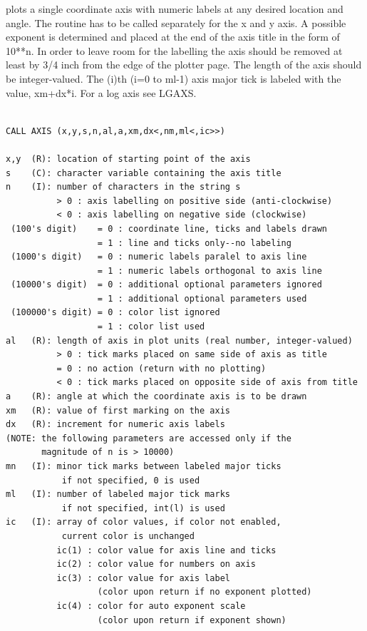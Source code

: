 \documentclass[11pt]{report}
\begin{document}
 plots a single coordinate axis with numeric labels at any desired 
location and angle.  The routine has to be
called separately for the x and y axis.  A possible exponent
is determined and placed at the end of the axis title in the form
of 10**n.  In  order  to  leave room  for the labelling the
axis should be removed at least by 3/4 inch from the edge of the plotter page.
The length of the axis should be integer-valued.  The (i)th (i=0 to ml-1)
axis major tick is labeled with the value, xm+dx*i.
For a log axis see LGAXS.
\begin{verbatim}

CALL AXIS (x,y,s,n,al,a,xm,dx<,nm,ml<,ic>>)

x,y  (R): location of starting point of the axis
s    (C): character variable containing the axis title
n    (I): number of characters in the string s
          > 0 : axis labelling on positive side (anti-clockwise)
          < 0 : axis labelling on negative side (clockwise)
 (100's digit)    = 0 : coordinate line, ticks and labels drawn
                  = 1 : line and ticks only--no labeling
 (1000's digit)   = 0 : numeric labels paralel to axis line
                  = 1 : numeric labels orthogonal to axis line
 (10000's digit)  = 0 : additional optional parameters ignored
                  = 1 : additional optional parameters used
 (100000's digit) = 0 : color list ignored
                  = 1 : color list used
al   (R): length of axis in plot units (real number, integer-valued)
          > 0 : tick marks placed on same side of axis as title
          = 0 : no action (return with no plotting)
          < 0 : tick marks placed on opposite side of axis from title
a    (R): angle at which the coordinate axis is to be drawn
xm   (R): value of first marking on the axis
dx   (R): increment for numeric axis labels
(NOTE: the following parameters are accessed only if the
       magnitude of n is > 10000)
mn   (I): minor tick marks between labeled major ticks
           if not specified, 0 is used
ml   (I): number of labeled major tick marks
           if not specified, int(l) is used
ic   (I): array of color values, if color not enabled,
           current color is unchanged
          ic(1) : color value for axis line and ticks
          ic(2) : color value for numbers on axis
          ic(3) : color value for axis label 
                  (color upon return if no exponent plotted)
          ic(4) : color for auto exponent scale
                  (color upon return if exponent shown)
\end{verbatim}
\end{document}
